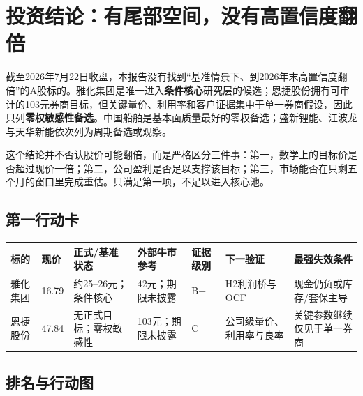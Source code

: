 \chapter{投资结论：有尾部空间，没有高置信度翻倍}

\begin{houseviewbox}
截至2026年7月22日收盘，本报告没有找到“基准情景下、到2026年末高置信度翻倍”的A股标的。雅化集团是唯一进入\textbf{条件核心}研究层的候选；恩捷股份拥有可审计的103元券商目标，但关键量价、利用率和客户证据集中于单一券商假设，因此只列\textbf{零权敏感性备选}。中国船舶是基本面质量最好的零权备选；盛新锂能、江波龙与天华新能依次列为周期备选或观察。
\end{houseviewbox}

这个结论并不否认股价可能翻倍，而是严格区分三件事：第一，数学上的目标价是否超过现价一倍；第二，公司盈利是否足以支撑该目标；第三，市场能否在只剩五个月的窗口里完成重估。只满足第一项，不足以进入核心池。

\section{第一行动卡}

\begin{exhibitbox}
\small
\begin{tabularx}{\exhibitboxwidth}{L{2.2cm} R{1.3cm} L{2.2cm} L{1.7cm} L{1.4cm} X X}
\toprule
标的 & 现价 & 正式/基准状态 & 外部牛市参考 & 证据级别 & 下一验证 & 最强失效条件 \\
\midrule
雅化集团 & 16.79 & 约25--26元；条件核心 & 42元；期限未披露 & B+ & H2利润桥与OCF & 现金仍负或库存/套保主导 \\
恩捷股份 & 47.84 & 无正式目标；零权敏感性 & 103元；期限未披露 & C & 公司级量价、利用率与良率 & 关键参数继续仅见于单一券商 \\
\bottomrule
\end{tabularx}
\end{exhibitbox}

\section{排名与行动图}

